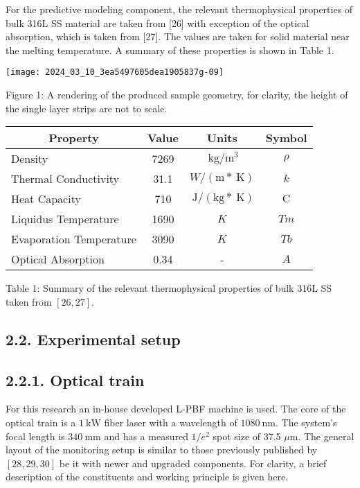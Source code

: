 \documentclass[10pt]{article}
\begin{document}
For the predictive modeling component, the relevant thermophysical properties of bulk 316L SS material are taken from [26] with exception of the optical absorption, which is taken from [27]. The values are taken for solid material near the melting temperature. A summary of these properties is shown in Table 1.

\begin{center}
\texttt{[image: 2024\_03\_10\_3ea5497605dea1905837g-09]}
\end{center}

Figure 1: A rendering of the produced sample geometry, for clarity, the height of the single layer strips are not to scale.

\begin{center}
\begin{tabular}{|l|c|c|c|}
\hline
\multicolumn{1}{|c|}{Property} & Value & Units & Symbol \\
\hline
Density & 7269 & $\mathrm{~kg} / \mathrm{m}^{3}$ & $\rho$ \\
\hline
Thermal Conductivity & 31.1 & $W /(\mathrm{m} * \mathrm{~K})$ & $k$ \\
\hline
Heat Capacity & 710 & $\mathrm{~J} /(\mathrm{kg} * \mathrm{~K})$ & $\mathrm{C}$ \\
\hline
Liquidus Temperature & 1690 & $K$ & $T m$ \\
\hline
Evaporation Temperature & 3090 & $K$ & $T b$ \\
\hline
Optical Absorption & 0.34 & - & $A$ \\
\hline
\end{tabular}
\end{center}

Table 1: Summary of the relevant thermophysical properties of bulk 316L SS taken from $[26,27]$.

\subsection*{2.2. Experimental setup}
\subsection*{2.2.1. Optical train}
For this research an in-house developed L-PBF machine is used. The core of the optical train is a $1 \mathrm{~kW}$ fiber laser with a wavelength of $1080 \mathrm{~nm}$. The system's focal length is $340 \mathrm{~mm}$ and has a measured $1 / e^{2}$ spot size of 37.5 $\mu \mathrm{m}$. The general layout of the monitoring setup is similar to those previously published by $[28,29,30]$ be it with newer and upgraded components. For clarity, a brief description of the constituents and working principle is given here.
\end{document}
